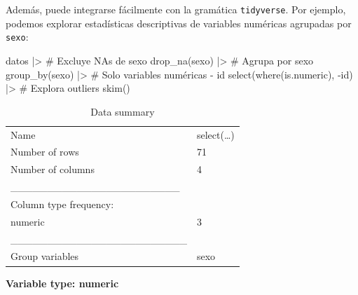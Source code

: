\documentclass[
  spanish,
  a4paper,
]{scrbook}
\newenvironment{Shaded}{\begin{snugshade}}{\end{snugshade}}
\newcommand{\CommentTok}[1]{\textcolor[rgb]{0.37,0.37,0.37}{#1}}
\newcommand{\FunctionTok}[1]{\textcolor[rgb]{0.28,0.35,0.67}{#1}}
\newcommand{\NormalTok}[1]{\textcolor[rgb]{0.00,0.23,0.31}{#1}}
\newcommand{\SpecialCharTok}[1]{\textcolor[rgb]{0.37,0.37,0.37}{#1}}
\begin{document}
Además, puede integrarse fácilmente con la gramática \texttt{tidyverse}.
Por ejemplo, podemos explorar estadísticas descriptivas de variables
numéricas agrupadas por \texttt{sexo}:

\begin{Shaded}
\begin{Highlighting}[]
\NormalTok{datos }\SpecialCharTok{|\textgreater{}}
  \CommentTok{\# Excluye NAs de sexo}
  \FunctionTok{drop\_na}\NormalTok{(sexo) }\SpecialCharTok{|\textgreater{}}
  \CommentTok{\# Agrupa por sexo}
  \FunctionTok{group\_by}\NormalTok{(sexo) }\SpecialCharTok{|\textgreater{}}
  \CommentTok{\# Solo variables numéricas {-} id}
  \FunctionTok{select}\NormalTok{(}\FunctionTok{where}\NormalTok{(is.numeric), }\SpecialCharTok{{-}}\NormalTok{id) }\SpecialCharTok{|\textgreater{}}
  \CommentTok{\# Explora outliers}
  \FunctionTok{skim}\NormalTok{()}
\end{Highlighting}
\end{Shaded}

\begin{longtable}[]{@{}ll@{}}
\caption{Data summary}\tabularnewline
\toprule\noalign{}
\endfirsthead
\endhead
\bottomrule\noalign{}
\endlastfoot
Name & select(\ldots) \\
Number of rows & 71 \\
Number of columns & 4 \\
\_\_\_\_\_\_\_\_\_\_\_\_\_\_\_\_\_\_\_\_\_\_\_ & \\
Column type frequency: & \\
numeric & 3 \\
\_\_\_\_\_\_\_\_\_\_\_\_\_\_\_\_\_\_\_\_\_\_\_\_ & \\
Group variables & sexo \\
\end{longtable}

\textbf{Variable type: numeric}
\end{document}

